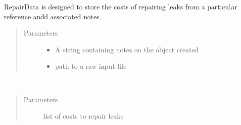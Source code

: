 \documentclass[letterpaper,10pt,english]{sphinxmanual}
\begin{document}
\begin{fulllineitems}
\label{\detokenize{index:feast.input_data_classes.RepairData}}
RepairData is designed to store the costs of repairing leaks from a particular reference andd associated notes.
\begin{quote}\begin{description}
\item[{Parameters}] \leavevmode\begin{itemize}
\item {} 
 \textendash{} A string containing notes on the object created

\item {} 
 \textendash{} path to a raw input file

\end{itemize}

\end{description}\end{quote}

\begin{fulllineitems}
\label{\detokenize{index:feast.input_data_classes.RepairData.define_data}}~\begin{quote}\begin{description}
\item[{Parameters}] \leavevmode
{} \textendash{} list of costs to repair leaks

\end{description}\end{quote}

\end{fulllineitems}


\end{fulllineitems}
\end{document}
